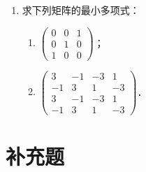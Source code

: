 \begin{enumerate}
  \begin{enumerate}
    \item $V$ 中包含 $\varepsilon_1$ 的 $\mathcal{A}$-子空间只有 $V$ 自身；
  \anssub
    \item $V$ 中任一非零 $\mathcal{A}$-子空间都包含 $\varepsilon_n$；
  \anssub
    \item $V$ 不能分解成两个非平凡的 $\mathcal{A}$-子空间的直和．
  \anssub
  \end{enumerate}
  \item 求下列矩阵的最小多项式：
  \begin{enumerate}
    \item $\begin{pmatrix}0&0&1\\0&1&0\\1&0&0\end{pmatrix}$；
  \anssub
    \item $\begin{pmatrix}3&-1&-3&1\\-1&3&1&-3\\3&-1&-3&1\\-1&3&1&-3\end{pmatrix}$．
  \anssub
  \end{enumerate}
\end{enumerate}

\section{补充题}

